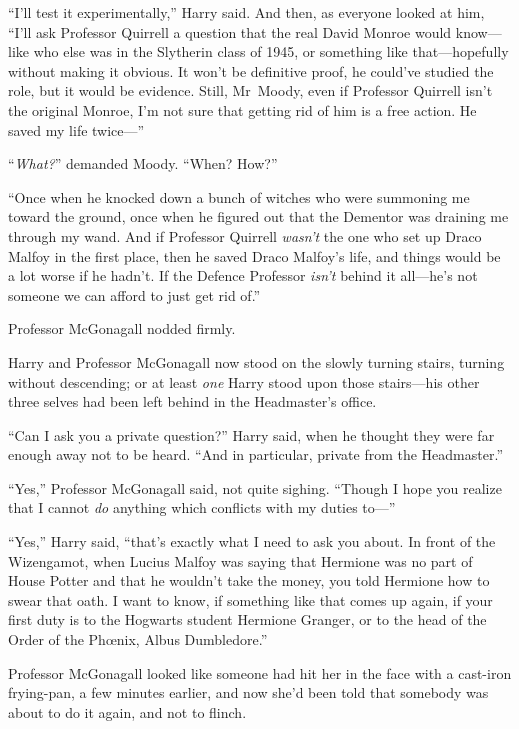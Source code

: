 “I’ll test it experimentally,” Harry said. And then, as everyone looked at him, “I’ll ask Professor Quirrell a question that the real David Monroe would know—like who else was in the Slytherin class of 1945, or something like that—hopefully without making it obvious. It won’t be definitive proof, he could’ve studied the role, but it would be evidence. Still, Mr~Moody, even if Professor Quirrell isn’t the original Monroe, I’m not sure that getting rid of him is a free action. He saved my life twice—”

“\emph{What?}” demanded Moody. “When? How?”

“Once when he knocked down a bunch of witches who were summoning me toward the ground, once when he figured out that the Dementor was draining me through my wand. And if Professor Quirrell \emph{wasn’t} the one who set up Draco Malfoy in the first place, then he saved Draco Malfoy’s life, and things would be a lot worse if he hadn’t. If the Defence Professor \emph{isn’t} behind it all—he’s not someone we can afford to just get rid of.”

Professor McGonagall nodded firmly.


Harry and Professor McGonagall now stood on the slowly turning stairs, turning without descending; or at least \emph{one} Harry stood upon those stairs—his other three selves had been left behind in the Headmaster’s office.

“Can I ask you a private question?” Harry said, when he thought they were far enough away not to be heard. “And in particular, private from the Headmaster.”

“Yes,” Professor McGonagall said, not quite sighing. “Though I hope you realize that I cannot \emph{do} anything which conflicts with my duties to—”

“Yes,” Harry said, “that’s exactly what I need to ask you about. In front of the Wizengamot, when Lucius Malfoy was saying that Hermione was no part of House Potter and that he wouldn’t take the money, you told Hermione how to swear that oath. I want to know, if something like that comes up again, if your first duty is to the Hogwarts student Hermione Granger, or to the head of the Order of the Phœnix, Albus Dumbledore.”

Professor McGonagall looked like someone had hit her in the face with a cast-iron frying-pan, a few minutes earlier, and now she’d been told that somebody was about to do it again, and not to flinch.


